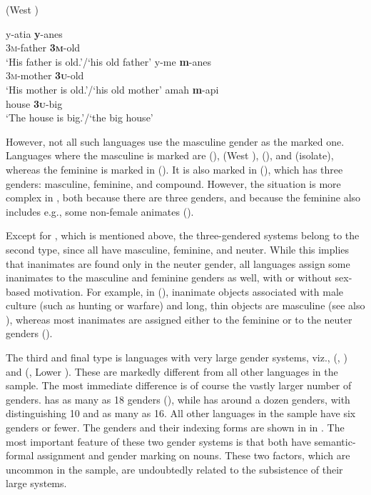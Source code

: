 \documentclass[output=collectionpaper]{langsci/langscibook}
\begin{document}
\ea
\label{ex:Svard:4}
 (West ) \citep[90]{Dol2007}\\
\begin{xlist}
\ex
\gll y-atia \textbf{y}{}-anes\\
     \textsc{3m-}father \textsc{\textbf{3m}}{}-old\\
\glt `His father is old.'/`his old father'
\ex
\gll y-me \textbf{m}{}-anes\\
     \textsc{3m-}mother \textsc{\textbf{3u}}{}-old\\
\glt `His mother is old.'/`his old mother'
\ex
\gll amah \textbf{m}{}-api\\
     house \textsc{\textbf{3u}}{}-big\\
\glt `The house is big.'/`the big house'
\end{xlist}
\z

However, not all such languages use the masculine gender as the marked one. Languages where the masculine is marked are  (),  (West ),  (), and  (isolate), whereas the feminine is marked in  (). It is also marked in  (), which has three genders: masculine, feminine, and compound. However, the situation is more complex in , both because there are three genders, and because the feminine also includes e.g., some non-female animates (\citealt[68]{Arsjoe1999}).

Except for , which is mentioned above, the three-gendered systems belong to the second type, since all have masculine, feminine, and neuter. While this implies that inanimates are found only in the neuter gender, all languages assign some inanimates to the masculine and feminine genders as well, with or without sex-based motivation. For example, in  (), inanimate objects associated with male culture (such as hunting or warfare) and long, thin objects are masculine (see also ), whereas most inanimates are assigned either to the feminine or to the neuter genders (\citealt[46--48]{Robinson2011}).

The third and final type is languages with very large gender systems, viz.,  (, ) and  (, Lower ). These are markedly different from all other languages in the sample. The most immediate difference is of course the vastly larger number of genders.  has as many as 18 genders (\citealt[8--10]{Conrad1991}), while  has around a dozen genders, with \citet[119]{Foley1991} distinguishing 10 and \citet[175]{Phillips1993} as many as 16. All other languages in the sample have six genders or fewer. The  genders and their indexing forms are shown in  in . The most important feature of these two gender systems is that both have semantic-formal assignment and gender marking on nouns. These two factors, which are uncommon in the sample, are undoubtedly related to the subsistence of their large systems.
\end{document}
